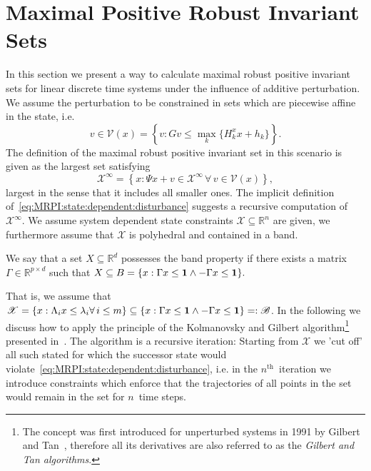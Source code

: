 \section{Maximal Positive Robust Invariant Sets}\label{sec:parametrised:MRPI:set}
In this section we present a way to calculate maximal robust positive invariant sets for
linear discrete time systems under the influence of additive perturbation.
%
We assume the perturbation to be constrained in sets which are piecewise affine in
the state, i.e.
%
\begin{equation}\label{eq:definition:PWA:uncertainty}
v\in \mathcal V(x) = \left\{v: Gv\leq\max_k\{H_k^x x + h_k\}\right\}.
\end{equation}
%
The definition of the maximal robust positive invariant set in this scenario is given as
the largest set satisfying
%
\begin{equation}\label{eq:MRPI:state:dependent:disturbance}
	\mathcal X^\infty = \left\{x: \Psi x + v \in\mathcal X^\infty\,\forall\, v\in\mathcal V(x)\right\},
\end{equation}
%
largest in the sense that it includes all smaller ones.
%
The implicit definition of~\eqref{eq:MRPI:state:dependent:disturbance} suggests a recursive 
computation of $\mathcal X^\infty$.
%
We assume system dependent state constraints $\mathscr X\subseteq\mathbb R^n$ are given,
we furthermore assume that $\mathscr X$ is polyhedral and contained in a band.
%
\begin{defi}
We say that a set $X\subseteq\mathbb R^d$ possesses the band property if there exists a 
matrix~$\Gamma\in\mathbb R^{p\times d}$ such that $X\subseteq B = \{x:\Gamma x\leq {\bf{1}}\wedge
-\Gamma x\leq{\bf{1}}\}.$
\end{defi}
%
That is, we assume that $\mathscr X= \{x:\Lambda_i x \leq \lambda_i \forall\, i\leq m\}\subseteq\{x:\Gamma x\leq{\bf{1}}\wedge
-\Gamma x\leq{\bf{1}}\}=:\mathscr B$.
%
In the following we discuss how to apply the principle of the Kolmanovsky and Gilbert 
algorithm\footnote{The concept was first introduced for 
unperturbed systems in 1991 by Gilbert and Tan~\cite{Gilbert:1991}, therefore all its derivatives 
are also referred to as the \emph{Gilbert and Tan algorithms}.} 
presented in~\cite{Kolmanovsky:1995}.
%
The algorithm is a recursive iteration: Starting from $\mathscr X$ we 'cut off' all such stated 
for which the successor state would violate~\eqref{eq:MRPI:state:dependent:disturbance}, i.e.
in the $n^\text{th}$~iteration we introduce constraints which enforce that the trajectories
of all points in the set would remain in the set for $n$~time steps.
